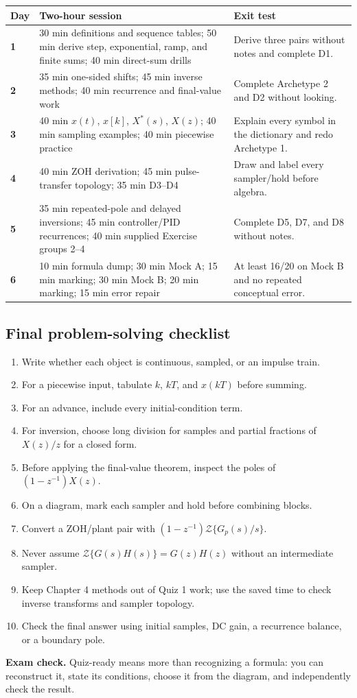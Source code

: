 \documentclass[11pt]{article}
\newcommand{\Z}{\mathcal{Z}}
\newcommand{\examcheck}[1]{\par\smallskip\noindent\colorbox{blue!7}{\parbox{\dimexpr\linewidth-2\fboxsep\relax}{\textbf{Exam check.} #1}}\par\smallskip}
\begin{document}
\begin{center}
\begin{tabular}{>{\bfseries}p{}p{}p{}}
\toprule
Day & Two-hour session & Exit test\\
\midrule
1 & 30 min definitions and sequence tables; 50 min derive step, exponential, ramp, and finite sums; 40 min direct-sum drills & Derive three pairs without notes and complete D1.\\
2 & 35 min one-sided shifts; 45 min inverse methods; 40 min recurrence and final-value work & Complete Archetype 2 and D2 without looking.\\
3 & 40 min $x(t)$, $x[k]$, $X^*(s)$, $X(z)$; 40 min sampling examples; 40 min piecewise practice & Explain every symbol in the dictionary and redo Archetype 1.\\
4 & 40 min ZOH derivation; 45 min pulse-transfer topology; 35 min D3--D4 & Draw and label every sampler/hold before algebra.\\
5 & 35 min repeated-pole and delayed inversions; 45 min controller/PID recurrences; 40 min supplied Exercise groups 2--4 & Complete D5, D7, and D8 without notes.\\
6 & 10 min formula dump; 30 min Mock A; 15 min marking; 30 min Mock B; 20 min marking; 15 min error repair & At least 16/20 on Mock B and no repeated conceptual error.\\
\bottomrule
\end{tabular}
\end{center}

\subsection{Final problem-solving checklist}

\begin{enumerate}
  \item Write whether each object is continuous, sampled, or an impulse train.
  \item For a piecewise input, tabulate $k$, $kT$, and $x(kT)$ before summing.
  \item For an advance, include every initial-condition term.
  \item For inversion, choose long division for samples and partial fractions of $X(z)/z$ for a closed form.
  \item Before applying the final-value theorem, inspect the poles of $(1-z^{-1})X(z)$.
  \item On a diagram, mark each sampler and hold before combining blocks.
  \item Convert a ZOH/plant pair with $(1-z^{-1})\Z\{G_p(s)/s\}$.
  \item Never assume $\Z\{G(s)H(s)\}=G(z)H(z)$ without an intermediate sampler.
  \item Keep Chapter 4 methods out of Quiz 1 work; use the saved time to check inverse transforms and sampler topology.
  \item Check the final answer using initial samples, DC gain, a recurrence balance, or a boundary pole.
\end{enumerate}

\examcheck{Quiz-ready means more than recognizing a formula: you can reconstruct it, state its conditions, choose it from the diagram, and independently check the result.}
\end{document}

